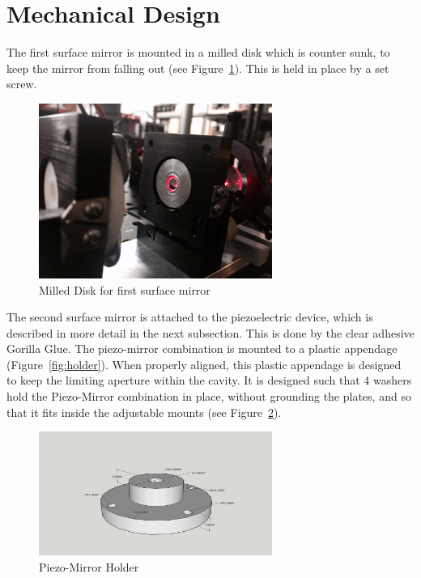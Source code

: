 \documentclass[12pt,journal]{IEEEtran}
\begin{document}
\section{Mechanical Design} \label{ss:mechanical_design}

The first surface mirror is mounted in a milled disk which is counter sunk, to keep the mirror from falling out (see Figure~\ref{fig:fsm}). This is held in place by a set screw. 

\begin{figure}[h!]
  \centering
	\includegraphics[width=3in]{first-lens-holder.png}
	\caption{Milled Disk for first surface mirror}
	\label{fig:fsm}
\end{figure}

The second surface mirror is attached to the piezoelectric device, which is described in more detail in the next subsection. This is done by the clear adhesive Gorilla Glue. The piezo-mirror combination is mounted to a plastic appendage (Figure~\ref{fig:holder}). When properly aligned, this plastic appendage is designed to keep the limiting aperture within the cavity. It is designed such that 4 washers hold the Piezo-Mirror combination in place, without grounding the plates, and so that it fits inside the adjustable mounts (see Figure~\ref{fig:plastic-mount-piezo-mirror}).  

\begin{figure}[h!]
   \centering
   	\includegraphics[width=3in]{./mechanical/PZT_holder_3d_rep.png}
	\caption{Piezo-Mirror Holder}
	\label{fig:plastic-mount-piezo-mirror}
\end{figure}
\end{document}

